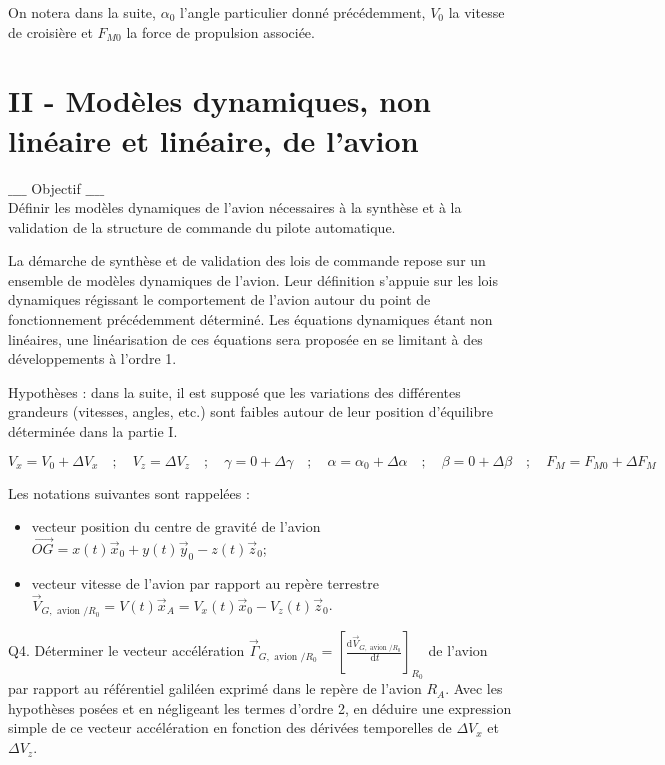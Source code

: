 \documentclass[10pt]{article}
\begin{document}
On notera dans la suite, $\alpha_{0}$ l'angle particulier donné précédemment, $V_{0}$ la vitesse de croisière et $F_{M 0}$ la force de propulsion associée.

\section*{II - Modèles dynamiques, non linéaire et linéaire, de l'avion}
$\_\_\_\_$ Objectif $\_\_\_\_$\\
Définir les modèles dynamiques de l'avion nécessaires à la synthèse et à la validation de la structure de commande du pilote automatique.

La démarche de synthèse et de validation des lois de commande repose sur un ensemble de modèles dynamiques de l'avion. Leur définition s'appuie sur les lois dynamiques régissant le comportement de l'avion autour du point de fonctionnement précédemment déterminé. Les équations dynamiques étant non linéaires, une linéarisation de ces équations sera proposée en se limitant à des développements à l'ordre 1.

Hypothèses : dans la suite, il est supposé que les variations des différentes grandeurs (vitesses, angles, etc.) sont faibles autour de leur position d'équilibre déterminée dans la partie I.

$$
V_{x}=V_{0}+\Delta V_{x} \quad ; \quad V_{z}=\Delta V_{z} \quad ; \quad \gamma=0+\Delta \gamma \quad ; \quad \alpha=\alpha_{0}+\Delta \alpha \quad ; \quad \beta=0+\Delta \beta \quad ; \quad F_{M}=F_{M 0}+\Delta F_{M}
$$

Les notations suivantes sont rappelées :

\begin{itemize}
  \item[-] vecteur position du centre de gravité de l'avion $\overrightarrow{O G}=x(t) \vec{x}_{0}+y(t) \vec{y}_{0}-z(t) \vec{z}_{0}$;
  \item[-] vecteur vitesse de l'avion par rapport au repère terrestre $\vec{V}_{G, \text { avion } / R_{0}}=V(t) \vec{x}_{A}=V_{x}(t) \vec{x}_{0}-V_{z}(t) \vec{z}_{0}$.
\end{itemize}

Q4. Déterminer le vecteur accélération $\vec{\Gamma}_{G, \text { avion } / R_{0}}=\left[\frac{\mathrm{d} \vec{V}_{G, \text { avion } / R_{0}}}{\mathrm{~d} t}\right]_{R_{0}}$ de l'avion par rapport au référentiel galiléen exprimé dans le repère de l'avion $R_{A}$. Avec les hypothèses posées et en négligeant les termes d'ordre 2, en déduire une expression simple de ce vecteur accélération en fonction des dérivées temporelles de $\Delta V_{x}$ et $\Delta V_{z}$.
\end{document}
